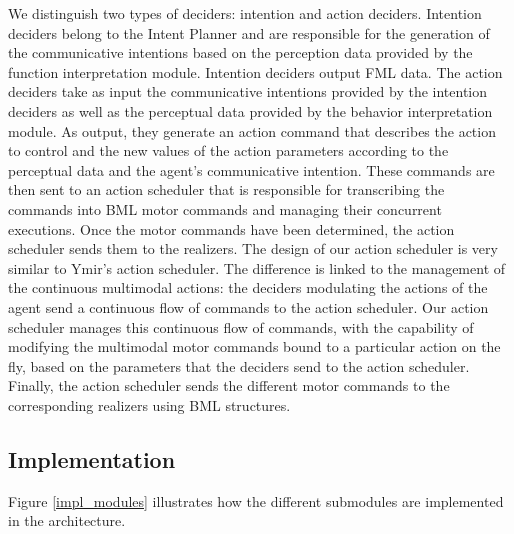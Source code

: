 \documentclass[twocolumn]{svjour3}
\begin{document}
We distinguish two types of deciders: intention and action deciders. 
Intention deciders belong to the Intent Planner and are responsible for the generation of the communicative intentions based on the perception data provided by the function interpretation module. Intention deciders output FML data. 
The action deciders take as input the communicative intentions provided by the intention deciders as well as the perceptual data provided by the behavior interpretation module. As output, they generate an action command that describes the action to control and the new values of the action parameters according to the perceptual data and the agent's communicative intention. 
These commands are then sent to an action scheduler that is responsible for transcribing the commands into BML motor commands and managing their concurrent executions. Once the motor commands have been determined, the action scheduler sends them to the realizers. 
The design of our action scheduler is very similar to Ymir's action scheduler. The difference is linked to the management of the continuous multimodal actions: the deciders modulating the actions of the agent send a continuous flow of commands to the action scheduler. Our action scheduler manages this continuous flow of commands, with the capability of modifying the multimodal motor commands bound to a particular action on the fly, based on the parameters that the deciders send to the action scheduler. 
Finally, the action scheduler sends the different motor commands to the corresponding realizers using BML structures. 

\subsection{Implementation}

Figure \ref{impl_modules} illustrates how the different submodules are implemented in the architecture. 
\end{document}
